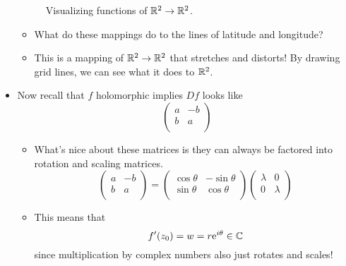 \documentclass[../notes.tex]{subfiles}
\begin{document}
\begin{itemize}
\begin{figure}[h!]
        \caption{Visualizing functions of $\R^2\to\R^2$.}
        \label{fig:mappings}
    \end{figure}
    \vspace{-0.5em}
    \begin{itemize}
        \item What do these mappings do to the lines of latitude and longitude?
        \item This is a mapping of $\R^2\to\R^2$ that stretches and distorts! By drawing grid lines, we can see what it does to $\R^2$.
    \end{itemize}
    \item Now recall that $f$ holomorphic implies $Df$ looks like
    \begin{equation*}
        \begin{pmatrix}
            a & -b\\
            b & a\\
        \end{pmatrix}
    \end{equation*}
    \begin{itemize}
        \item What's nice about these matrices is they can always be factored into rotation and scaling matrices.
        \begin{equation*}
            \begin{pmatrix}
                a & -b\\
                b & a\\
            \end{pmatrix}
            =
            \begin{pmatrix}
                \cos\theta & -\sin\theta\\
                \sin\theta & \cos\theta\\
            \end{pmatrix}
            \begin{pmatrix}
                \lambda & 0\\
                0 & \lambda\\
            \end{pmatrix}
            \tag{$\lambda,\theta\in\R$}
        \end{equation*}
        \item This means that
        \begin{equation*}
            f'(z_0) = w = r\e[i\theta] \in \C
        \end{equation*}
        since multiplication by complex numbers also just rotates and scales!

\end{itemize}
\end{itemize}
\end{document}
